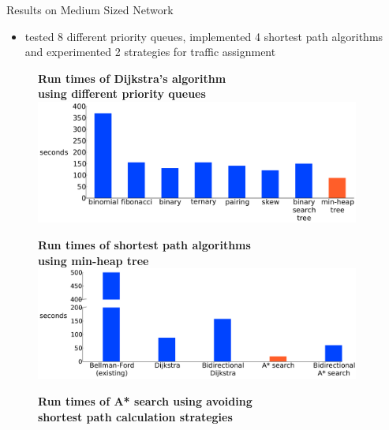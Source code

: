 \documentclass[final]{beamer}
\begin{document}
\begin{frame}{ }
\begin{columns}[t]
\begin{column}{.4\linewidth}
        \end{column}
        \begin{column}{.28\linewidth}
            \begin{block}{Results on Medium Sized Network}
                \begin{itemize}
                    \itemsep.5em
                    \item tested \alert{8 different priority queues}, implemented \alert{4 shortest path algorithms} and experimented \alert{2 strategies} for traffic assignment
                \end{itemize}
                \begin{figure}
                    \centering
                    {\bfseries \qquad Run times of Dijkstra's algorithm\\ \qquad using different priority queues}
                    \includegraphics[width=\linewidth]{img/pq_runtime}
                \end{figure}
                \begin{figure}
                    \centering
                    {\bfseries \qquad Run times of shortest path algorithms\\ using min-heap tree}
                    \includegraphics[width=\linewidth]{img/runtime}
                \end{figure}
                \begin{figure}
                    \centering
                    {\bfseries \qquad Run times of A* search using avoiding\\ \qquad shortest path calculation strategies}

\end{figure}
\end{block}
\end{column}
\end{columns}
\end{frame}
\end{document}
